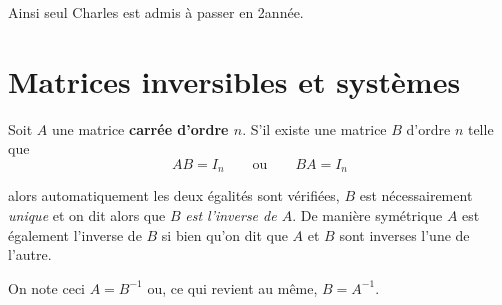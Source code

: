 Ainsi seul Charles est admis à passer en 2\eme année.

\section{Matrices inversibles et systèmes}

\begin{definition}
	Soit $A$ une matrice \textbf{carrée d'ordre $n$}. S'il existe une matrice $B$ d'ordre $n$ telle que
	$$AB = I_n\qquad\text{ou}\qquad BA=I_n$$
	
	alors automatiquement les deux égalités sont vérifiées, $B$ est nécessairement \textit{unique} et on dit alors que $B$ \textit{est l'inverse de $A$}. De manière symétrique $A$ est également l'inverse de $B$ si bien qu'on dit que $A$ et $B$ sont inverses l'une de l'autre.
	
	On note ceci $A=B^{-1}$ ou, ce qui revient au même, $B=A^{-1}$.
\end{definition}

